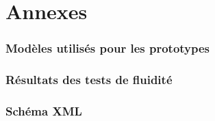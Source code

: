 \documentclass[paper=a4, fontsize=11pt]{article}
\newenvironment{changemargin}[2]{\begin{list}{}{%
\setlength{\topsep}{0pt}%
\setlength{\leftmargin}{0pt}%
\setlength{\rightmargin}{0pt}%
\setlength{\listparindent}{\parindent}%
\setlength{\itemindent}{\parindent}%
\setlength{\parsep}{0pt plus 1pt}%
\addtolength{\leftmargin}{#1}%
\addtolength{\rightmargin}{#2}%
}\item }{\end{list}}
\numberwithin{equation}{section}		%
\numberwithin{figure}{section}			%
\numberwithin{table}{section}				%
\begin{document}
\begin{changemargin}{-1cm}{-1cm}
\appendix
\part*{Annexes}
\section{Modèles utilisés pour les prototypes} \label{annexe:modeles}

\section{Résultats des tests de fluidité} \label{annexe:fluidite}


\newpage

\section{Schéma XML}


\newpage




\end{changemargin}

\end{document}
